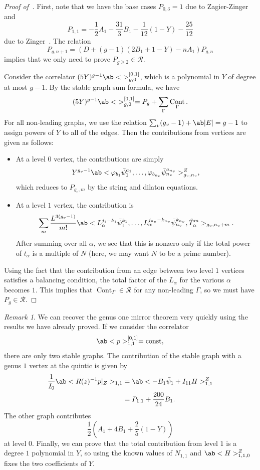 \documentclass[10pt]{amsart}
\theoremstyle{definition}
\theoremstyle{remark}
\newtheorem{rmk}[thm]{Remark}
\theoremstyle{plain}
\theoremstyle{definition}
\theoremstyle{remark}
\newcommand{\mc}[1]{\mathcal{#1}}
\newcommand{\mr}[1]{\mathrm{#1}}
\newcommand{\1}{\mathbf{1}}
\newcommand{\2}{\mathbf{2}}
\newcommand{\3}{\mathbf{3}}
\DeclareMathOperator{\Cont}{Cont}
\begin{document}
\begin{proof}[Proof of~]
    First, note that we have the base cases $P_{0,3} = 1$ due to Zagier-Zinger~\cite{zagierzinger} and
    \[ P_{1,1} = -\frac{1}{2} A_1 - \frac{31}{3} B_1 - \frac{1}{12} (1-Y) - \frac{25}{12} \]
    due to Zinger~\cite{reducedgenus1}. The relation 
    \[ P_{g,n+1} = (D + (g-1)(2B_1+1-Y) - nA_1) P_{g,n} \]
    implies that we only need to prove $P_{g \geq 2} \in \mc{R}$.

    Consider the correlator $(5Y)^{g-1}\ab<\ >_{g,0}^{[0,1]}$, which is a polynomial in $Y$ of degree at most $g-1$. By the stable graph sum formula, we have
    \[ (5Y)^{g-1}\ab<\ >_{g,0}^{[0,1]} = P_g + \sum_{\Gamma} \Cont_{\Gamma}. \]
    For all non-leading graphs, we use the relation $\sum_v (g_v-1) + \ab|E| = g-1$ to assign powers of $Y$ to all of the edges. Then the contributions from vertices are given as follows:
    \begin{itemize}
        \item At a level $0$ vertex, the contributions are simply
            \[ Y^{g_v-1} \ab<\varphi_{b_1} \bar{\psi}_1^{a_1}, \ldots, \varphi_{b_{n_v}} \bar{\psi}_{n_v}^{a_{n_v}}>^Z_{g_v, n_v}, \]
            which reduces to $P_{g_v, m}$ by the string and dilaton equations. 
        \item At a level $1$ vertex, the contribution is
            \[ \sum_m \frac{L^{3(g_v-1)}}{m!}\ab<L_{\alpha}^{j_1-k_1}\bar{\psi}_1^{k_1}, \ldots, L_{\alpha}^{j_{n_v} - k_{n_v}} \bar{\psi}_{n_v}^{k_{n_v}}, \tilde{T}_{\alpha}^m>_{g_v, n_v+m}. \]
            After summing over all $\alpha$, we see that this is nonzero only if the total power of $t_{\alpha}$ is a multiple of $N$ (here, we may want $N$ to be a prime number).
    \end{itemize}
    Using the fact that the contribution from an edge between two level $1$ vertices satisfies a balancing condition, the total factor of the $L_{\alpha}$ for the various $\alpha$ becomes $1$. This implies that $\Cont_{\Gamma} \in \mc{R}$ for any non-leading $\Gamma$, so we must have $P_g \in \mc{R}$.
\end{proof}

\begin{rmk}
    We can recover the genus one mirror theorem very quickly using the results we have already proved. If we consider the correlator
    \[ \ab<p>_{1,1}^{[0,1]} = \mr{const}, \]
    there are only two stable graphs. The contribution of the stable graph with a genus $1$ vertex at the quintic is given by
    \begin{align*}
        \frac{1}{I_0}\ab<R(z)^{-1}p|_Z>_{1,1} &= \ab<-B_1\bar{\psi}_1 + I_{11}H>^Z_{1,1} \\
        &= P_{1,1} + \frac{200}{24} B_1.
    \end{align*}
    The other graph contributes
    \[ \frac{1}{2}(A_1+4B_1 + \frac{2}{5}(1-Y)) \]
    at level $0$. Finally, we can prove that the total contribution from level $1$ is a degree $1$ polynomial in $Y$, so using the known values of $N_{1,1}$ and $\ab<H>^Z_{1,1,0}$ fixes the two coefficients of $Y$.
\end{rmk}
\end{document}
